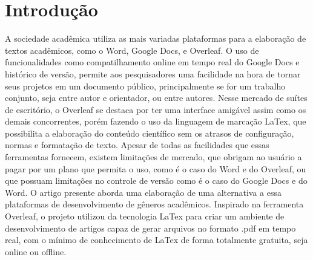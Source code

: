 \section{Introdução}

A sociedade acadêmica utiliza as mais variadas plataformas para a elaboração de textos acadêmicos, como o Word, Google Docs, e Overleaf. O uso de funcionalidades como compatilhamento online em tempo real do Google Docs e histórico de versão, permite aos pesquisadores uma facilidade na hora de tornar seus projetos em um documento público, principalmente se for um trabalho conjunto, seja entre autor e orientador, ou entre autores.
Nesse mercado de suítes de escritório, o Overleaf se destaca por ter uma interface amigável assim como os demais concorrentes, porém fazendo o uso da linguagem de marcação LaTex, que possibilita a elaboração do conteúdo científico sem os atrasos de configuração, normas e formatação de texto.
Apesar de todas as facilidades que essas ferramentas fornecem, existem limitações de mercado, que obrigam ao usuário a pagar por um plano que permita o uso, como é o caso do Word e do Overleaf, ou que possuam limitações no controle de versão como é o caso do Google Docs e do Word.
O artigo presente aborda uma elaboração de uma alternativa a essa plataformas de desenvolvimento de gêneros acadêmicos. Inspirado na ferramenta Overleaf, o projeto utilizou da tecnologia LaTex para criar um ambiente de desenvolvimento de artigos capaz de gerar arquivos no formato .pdf em tempo real, com o mínimo de conhecimento de LaTex de forma totalmente gratuita, seja online ou offline.